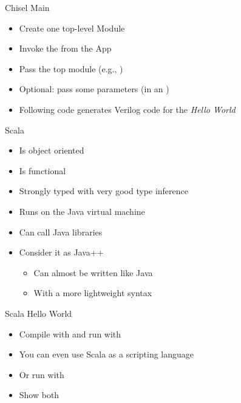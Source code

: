 


\begin{frame}[fragile]{Chisel Main}

\begin{itemize}
\item Create one top-level Module
\item Invoke the  from the App
\item Pass the top module (e.g., )
\item Optional: pass some parameters (in an )
\item Following code generates Verilog code for the \emph{Hello World}
\end{itemize}
\end{frame}

\begin{frame}[fragile]{Scala}
\begin{itemize}
\item Is object oriented
\item Is functional
\item Strongly typed with very good type inference
\item Runs on the Java virtual machine
\item Can call Java libraries
\item Consider it as Java++
\begin{itemize}
\item Can almost be written like Java
\item With a more lightweight syntax
\end{itemize}
\end{itemize}
\end{frame}

\begin{frame}[fragile]{Scala Hello World}
\begin{itemize}
\item Compile with  and run with 
\item You can even use Scala as a scripting language
\item Or run with 
\item Show both
\end{itemize}
\end{frame}

